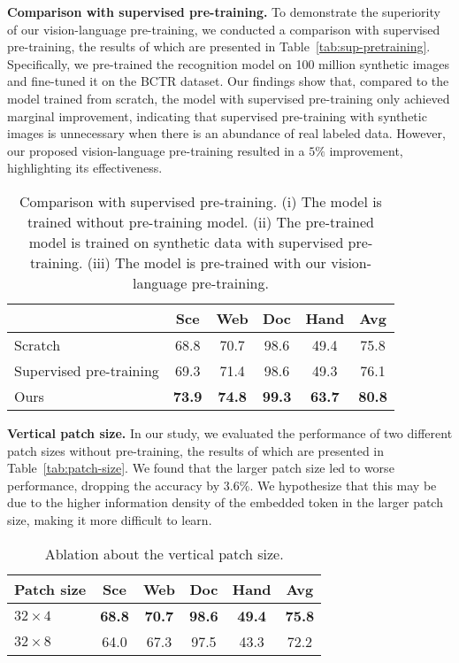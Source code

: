 \vspace{2mm}
\noindent\textbf{Comparison with supervised pre-training.} To demonstrate the superiority of our vision-language pre-training, we conducted a comparison with supervised pre-training, the results of which are presented in Table~\ref{tab:sup-pretraining}. Specifically, we pre-trained the recognition model on 100 million synthetic images and fine-tuned it on the BCTR dataset. Our findings show that, compared to the model trained from scratch, the model with supervised pre-training only achieved marginal improvement, indicating that supervised pre-training with synthetic images is unnecessary when there is an abundance of real labeled data. However, our proposed vision-language pre-training resulted in a $5\%$ improvement, highlighting its effectiveness.


\begin{table}
    \caption{Comparison with supervised pre-training. (i) The model is trained without pre-training model. (ii) The pre-trained model is trained on synthetic data with supervised pre-training. (iii) The model is pre-trained with our vision-language pre-training. }
    \label{tab:sup-pretraining}
    \setlength{\tabcolsep}{4.5pt}
    \centering
    \begin{tabular}{lccccc}
    \toprule
    &Sce &Web &Doc &Hand &Avg\\
    \midrule
    Scratch  &68.8 &70.7 &98.6 &49.4 &75.8 \\
    Supervised pre-training  &69.3 &71.4 &98.6 &49.3 &76.1 \\
    Ours   &\textbf{73.9} &\textbf{74.8} &\textbf{99.3} &\textbf{63.7} &\textbf{80.8} \\
    \bottomrule
    \end{tabular}
  \label{tab:tabe}
\end{table}

\vspace{2mm}
\noindent\textbf{Vertical patch size.} In our study, we evaluated the performance of two different patch sizes without pre-training, the results of which are presented in Table~\ref{tab:patch-size}. We found that the larger patch size led to worse performance, dropping the accuracy by $3.6\%$. We hypothesize that this may be due to the higher information density of the embedded token in the larger patch size, making it more difficult to learn.


\begin{table}[h]
    \caption{Ablation 
    about the vertical patch size.}
    \label{tab:patch-size}
    \setlength{\tabcolsep}{9pt}
    \centering
    \begin{tabular}{lccccc}
    \toprule
    {Patch size}
    &Sce &Web &Doc &Hand &Avg\\
    \midrule
    $32 \times 4$  &\textbf{68.8} &\textbf{70.7} &\textbf{98.6} &\textbf{49.4} &\textbf{75.8} \\
    $32 \times 8$  &64.0 &67.3 &97.5 &43.3 &72.2 \\
    \bottomrule
    \end{tabular}
  \label{tab:tabe}
\end{table}


